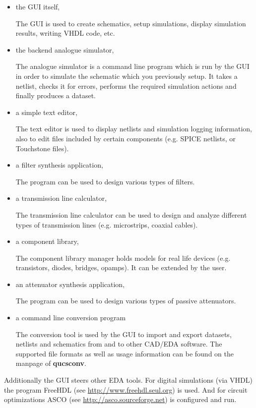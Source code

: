 \begin{itemize}
\item the GUI itself,

The GUI is used to create schematics, setup simulations, display
simulation results, writing VHDL code, etc.

\item the backend analogue simulator,

The analogue simulator is a command line program which is run by the
GUI in order to simulate the schematic which you previously setup.  It
takes a netlist, checks it for errors, performs the required
simulation actions and finally produces a dataset.

\item a simple text editor,

The text editor is used to display netlists and simulation logging
information, also to edit files included by certain components
(e.g. SPICE netlists, or Touchstone files).

\item a filter synthesis application,

The program can be used to design various types of filters.

\item a transmission line calculator,

The transmission line calculator can be used to design and analyze
different types of transmission lines (e.g. microstrips, coaxial
cables).

\item a component library,

The component library manager holds models for real life devices
(e.g. transistors, diodes, bridges, opamps).  It can be extended by
the user.

\item an attenuator synthesis application,

The program can be used to design various types of passive
attenuators.

\item a command line conversion program

The conversion tool is used by the GUI to import and export datasets,
netlists and schematics from and to other CAD/EDA software.  The
supported file formats as well as usage information can be found on
the manpage of \textbf{qucsconv}.

\end{itemize}

Additionally the GUI steers other EDA tools.  For digital simulations
(via VHDL) the program FreeHDL (see \url{http://www.freehdl.seul.org})
is used.  And for circuit optimizations ASCO (see
\url{http://asco.sourceforge.net}) is configured and run.

